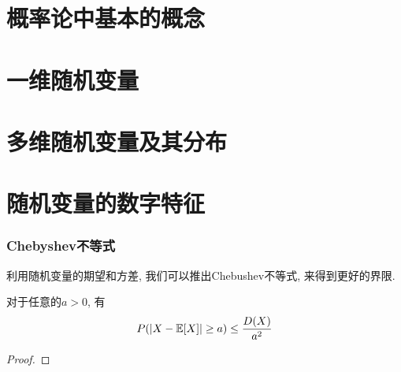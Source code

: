 
\usepackage{ctex}
\usepackage{pifont}
\usepackage{cleveref}
\usepackage{pstricks}
\usepackage{pgfplots}





\part{概率论中基本的概念}


\begin{shaded}
    
\end{shaded}


\begin{shaded}
    
\end{shaded}

\part{一维随机变量}





\part{多维随机变量及其分布}





\part{随机变量的数字特征}






\section{Chebyshev不等式}

利用随机变量的期望和方差, 我们可以推出Chebushev不等式, 来得到更好的界限. 

\begin{theorem}
    对于任意的$a>0$, 有
    $$
    P(|X-\mathbb E[X]|\geq a)\leq \frac{D(X)}{a^2}
    $$
\end{theorem}

\begin{proof}
    
\end{proof}




